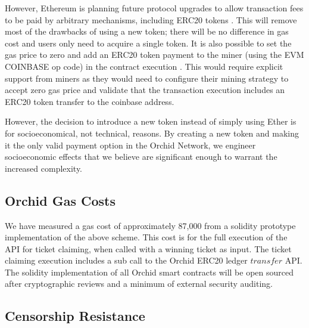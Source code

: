 However, Ethereum is planning future protocol upgrades to allow transaction fees to be paid by arbitrary mechanisms, including ERC20 tokens \cite{ETHAbstractions} \cite{ETHSerenity}. This will remove most of the drawbacks of using a new token; there will be no difference in gas cost and users only need to acquire a single token. It is also possible to set the gas price to zero and add an ERC20 token payment to the miner (using the EVM COINBASE\cite{ETHSpec} op code) in the contract execution \cite{ETHTokenFees}. This would require explicit support from miners as they would need to configure their mining strategy to accept zero gas price and validate that the transaction execution includes an ERC20 token transfer to the coinbase address.

However, the decision to introduce a new token instead of simply using Ether is for socioeconomical, not technical, reasons. By creating a new token and making it the only valid payment option in the Orchid Network, we engineer socioeconomic effects that we believe are significant enough to warrant the increased complexity.


\subsection{Orchid Gas Costs}

We have measured a gas cost of approximately 87,000 from a solidity prototype implementation of the above scheme. This cost is for the full execution of the API for ticket claiming, when called with a winning ticket as input. The ticket claiming execution includes a sub call to the Orchid ERC20 ledger $transfer$ API. The solidity implementation of all Orchid smart contracts will be open sourced after cryptographic reviews and a minimum of external security auditing.

\subsection{Censorship Resistance}


